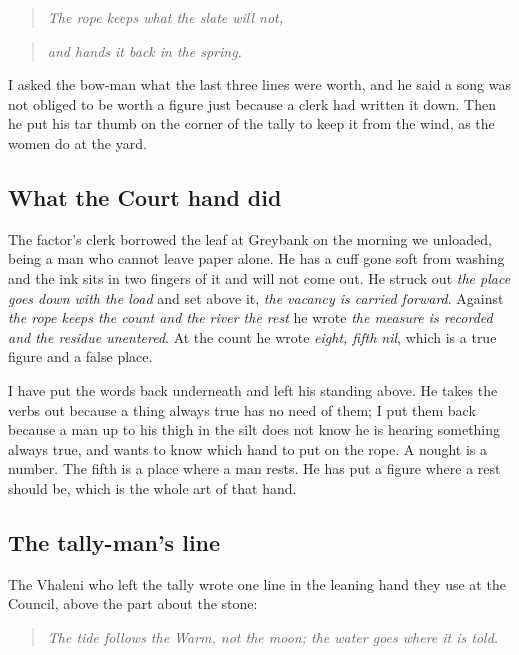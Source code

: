 \documentclass{design/chronicle}
\begin{document}
\begin{quote}\itshape The rope keeps what the slate will not,\end{quote}

\begin{quote}\itshape and hands it back in the spring.\end{quote}

I asked the bow-man what the last three lines were worth, and he said a song was not obliged to be worth a figure just because a clerk had written it down. Then he put his tar thumb on the corner of the tally to keep it from the wind, as the women do at the yard.

\subsection*{What the Court hand did}

The factor’s clerk borrowed the leaf at Greybank on the morning we unloaded, being a man who cannot leave paper alone. He has a cuff gone soft from washing and the ink sits in two fingers of it and will not come out. He struck out \emph{the place goes down with the load} and set above it, \emph{the vacancy is carried forward}. Against \emph{the rope keeps the count and the river the rest} he wrote \emph{the measure is recorded and the residue unentered}. At the count he wrote \emph{eight, fifth nil}, which is a true figure and a false place.

I have put the words back underneath and left his standing above. He takes the verbs out because a thing always true has no need of them; I put them back because a man up to his thigh in the silt does not know he is hearing something always true, and wants to know which hand to put on the rope. A nought is a number. The fifth is a place where a man rests. He has put a figure where a rest should be, which is the whole art of that hand.

\subsection*{The tally-man’s line}

The Vhaleni who left the tally wrote one line in the leaning hand they use at the Council, above the part about the stone:

\begin{quote}\itshape The tide follows the Warm, not the moon; the water goes where it is told.\end{quote}
\end{document}
